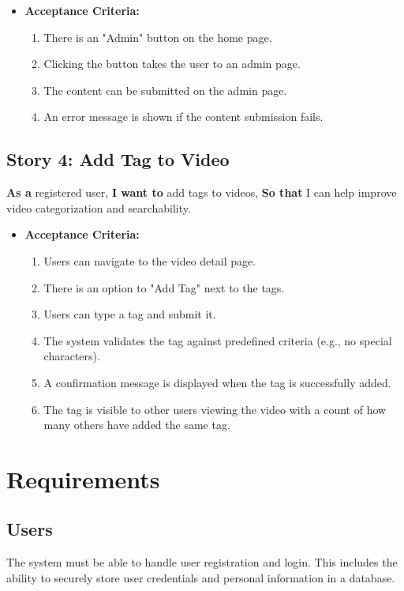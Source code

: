 \documentclass[12pt]{article}
\begin{document}
\begin{itemize}[label={}]
    \item \textbf{Acceptance Criteria:}
    \begin{enumerate}
        \item There is an "Admin" button on the home page.
        \item Clicking the button takes the user to an admin page.
        \item The content can be submitted on the admin page.
        \item An error message is shown if the content submission fails.
    \end{enumerate}
\end{itemize}

\subsection{Story 4: Add Tag to Video} 
\textbf{As a} registered user, 
\textbf{I want to} add tags to videos, 
\textbf{So that} I can help improve video categorization and searchability.

\begin{itemize}[label={}] 
    \item \textbf{Acceptance Criteria:} 
    \begin{enumerate} \item Users can navigate to the video detail page. 
        \item There is an option to "Add Tag" next to the tags. 
        \item Users can type a tag and submit it. 
        \item The system validates the tag against predefined criteria (e.g., no special characters). 
        \item A confirmation message is displayed when the tag is successfully added. 
        \item The tag is visible to other users viewing the video with a count of how many others have added the same tag. 
    \end{enumerate} 
\end{itemize}

\section{Requirements}
\subsection{Users}
The system must be able to handle user registration and login. 
This includes the ability to securely store user credentials and personal information in a database. 
\end{document}
